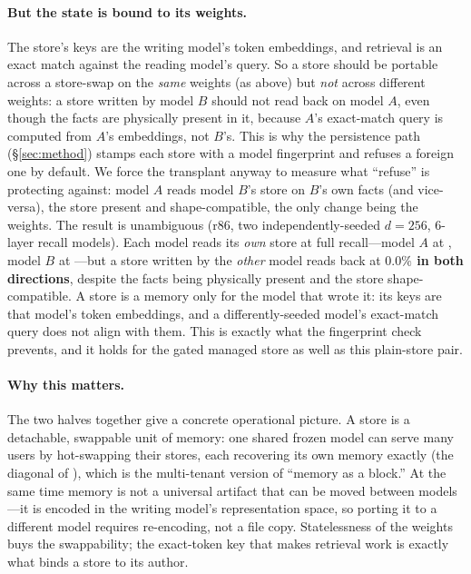 \paragraph{But the state is bound to its weights.} The store's keys are the writing
model's token embeddings, and retrieval is an exact match against the reading model's
query. So a store should be portable across a store-swap on the \emph{same} weights (as
above) but \emph{not} across different weights: a store written by model $B$ should not
read back on model $A$, even though the facts are physically present in it, because
$A$'s exact-match query is computed from $A$'s embeddings, not $B$'s. This is why the
persistence path (\S\ref{sec:method}) stamps each store with a model fingerprint and
refuses a foreign one by default. We force the transplant anyway to measure what
``refuse'' is protecting against: model $A$ reads model $B$'s store on $B$'s own facts
(and vice-versa), the store present and shape-compatible, the only change being the
weights. The result is unambiguous (r86, two independently-seeded $d{=}256$, $6$-layer
recall models). Each model reads its \emph{own} store at full recall---model $A$ at
, model $B$ at ---but a store written by the \emph{other} model
reads back at \textbf{$0.0\%$ in both directions}, despite the facts being physically
present and the store shape-compatible. A store is a memory only for the model that wrote
it: its keys are that model's token embeddings, and a differently-seeded model's
exact-match query does not align with them. This is exactly what the fingerprint check
prevents, and it holds for the gated managed store as well as this plain-store pair.

\paragraph{Why this matters.} The two halves together give a concrete operational
picture. A store is a detachable, swappable unit of memory: one shared frozen model can
serve many users by hot-swapping their stores, each recovering its own memory exactly
(the diagonal of ), which is the multi-tenant version of ``memory as
a block.'' At the same time memory is not a universal artifact that can be moved between
models---it is encoded in the writing model's representation space, so porting it to a
different model requires re-encoding, not a file copy. Statelessness of the weights buys
the swappability; the exact-token key that makes retrieval work is exactly what binds a
store to its author.
